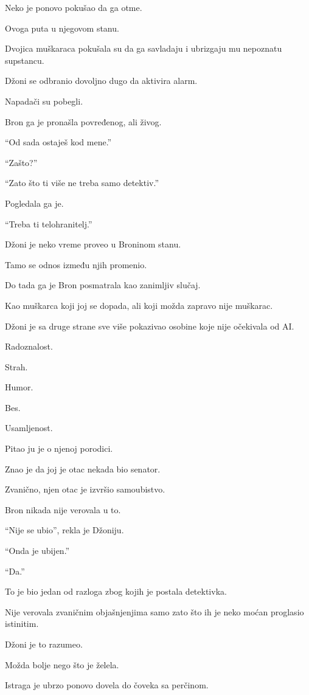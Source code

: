 Neko je ponovo pokušao da ga otme.

Ovoga puta u njegovom stanu.

Dvojica muškaraca pokušala su da ga savladaju i ubrizgaju mu nepoznatu supstancu.

Džoni se odbranio dovoljno dugo da aktivira alarm.

Napadači su pobegli.

Bron ga je pronašla povređenog, ali živog.

``Od sada ostaješ kod mene.''

``Zašto?''

``Zato što ti više ne treba samo detektiv.''

Pogledala ga je.

``Treba ti telohranitelj.''

\bigskip

Džoni je neko vreme proveo u Broninom stanu.

Tamo se odnos između njih promenio.

Do tada ga je Bron posmatrala kao zanimljiv slučaj.

Kao muškarca koji joj se dopada, ali koji možda zapravo nije muškarac.

Džoni je sa druge strane sve više pokazivao osobine koje nije očekivala od AI.

Radoznalost.

Strah.

Humor.

Bes.

Usamljenost.

Pitao ju je o njenoj porodici.

Znao je da joj je otac nekada bio senator.

Zvanično, njen otac je izvršio samoubistvo.

Bron nikada nije verovala u to.

``Nije se ubio'', rekla je Džoniju.

``Onda je ubijen.''

``Da.''

To je bio jedan od razloga zbog kojih je postala detektivka.

Nije verovala zvaničnim objašnjenjima samo zato što ih je neko moćan proglasio istinitim.

Džoni je to razumeo.

Možda bolje nego što je želela.

\bigskip

Istraga je ubrzo ponovo dovela do čoveka sa perčinom.

